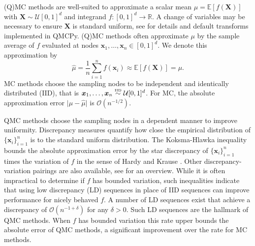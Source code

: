 \documentclass[graybox]{svmult}
\begin{document}
(Q)MC methods are well-suited to approximate a scalar mean $\mu = \mathbb{E}[f(\boldsymbol{X})]$ with $\boldsymbol{X} \sim \mathcal{U}[0,1]^d$ and integrand $f: [0,1]^{d} \to \mathbb{R}$. A change of variables may be necessary to ensure $\boldsymbol{X}$ is standard uniform, see \cite{QMCSoftware} for details and default transforms implemented in QMCPy. 
(Q)MC methods often approximate $\mu$ by the sample average of $f$ evaluated at nodes $\boldsymbol{x}_1,\dots,\boldsymbol{x}_n \in [0,1]^d$. We denote this approximation by  
\begin{equation}
    \label{SoRa_eq:mcapprox}
    \hat{\mu} = \frac{1}{n}\sum_{i=1}^n f(\boldsymbol{x}_i) \approx \mathbb{E}[f(\boldsymbol{X})] = \mu. 
\end{equation}
MC methods choose the sampling nodes to be independent and identically distributed (IID), that is $\boldsymbol{x}_1,\dots,\boldsymbol{x}_n \overset{\text{\tiny IID}}{\sim} \mathcal{U}[0,1]^{d}$. For MC, the absolute approximation error $\lvert \mu - \hat{\mu} \rvert$ is $\mathcal{O}(n^{-1/2})$. 

QMC methods choose the sampling nodes in a dependent manner to improve uniformity. Discrepancy measures quantify how close the empirical distribution of $\{\boldsymbol{x}_i\}_{i=1}^n$ is to the standard uniform distribution. The Koksma-Hlawka inequality bounds the absolute approximation error by the star discrepancy of $\{\boldsymbol{x}_i\}_{i=1}^n$ times the variation of $f$ in the sense of Hardy and Krause \cite{dick2013high}. Other discrepancy-variation pairings are also available, see \cite{hickernell1998generalized} for an overview. While it is often impractical to determine if $f$ has bounded variation, such inequalities indicate that using low discrepancy (LD) sequences in place of IID sequences can improve performance for nicely behaved $f$. A number of LD sequences exist that achieve a discrepancy of $\mathcal{O}(n^{-1+\delta})$ for any $\delta > 0$. Such LD sequences are the hallmark of QMC methods. When $f$ has bounded variation this rate upper bounds the absolute error of QMC methods, a significant improvement over the rate for MC methods. %
\end{document}
